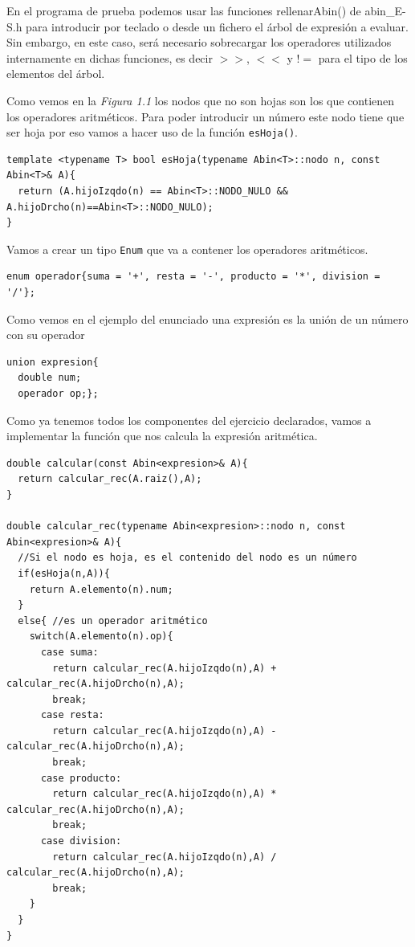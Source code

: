  En el programa de prueba podemos usar las funciones rellenarAbin() de abin\_E-S.h para introducir por teclado o desde un fichero el árbol de expresión a evaluar. Sin
embargo, en este caso, será necesario sobrecargar los operadores utilizados internamente
en dichas funciones, es decir \(>>\), \(<<\) y \(!=\) para el tipo de los elementos del árbol.

Como vemos en la \textit{Figura 1.1} los nodos que no son hojas son los que contienen los operadores aritméticos. Para poder introducir un número este nodo tiene que ser hoja por eso vamos a hacer uso de la función \texttt{esHoja()}.
\begin{verbatim}
template <typename T> bool esHoja(typename Abin<T>::nodo n, const Abin<T>& A){
  return (A.hijoIzqdo(n) == Abin<T>::NODO_NULO && A.hijoDrcho(n)==Abin<T>::NODO_NULO);
} 
\end{verbatim}

Vamos a crear un tipo \texttt{Enum} que va a contener los operadores aritméticos.
\begin{verbatim}
enum operador{suma = '+', resta = '-', producto = '*', division = '/'};
\end{verbatim}

Como vemos en el ejemplo del enunciado una expresión es la unión de un número con su operador
\begin{verbatim}
union expresion{
  double num;
  operador op;};
\end{verbatim}

Como ya tenemos todos los componentes del ejercicio declarados, vamos a implementar la función que nos calcula la expresión aritmética.
\begin{verbatim}
double calcular(const Abin<expresion>& A){
  return calcular_rec(A.raiz(),A);
}

double calcular_rec(typename Abin<expresion>::nodo n, const Abin<expresion>& A){
  //Si el nodo es hoja, es el contenido del nodo es un número
  if(esHoja(n,A)){
    return A.elemento(n).num;
  }
  else{ //es un operador aritmético
    switch(A.elemento(n).op){
      case suma:
        return calcular_rec(A.hijoIzqdo(n),A) + calcular_rec(A.hijoDrcho(n),A);
        break;
      case resta:
        return calcular_rec(A.hijoIzqdo(n),A) - calcular_rec(A.hijoDrcho(n),A);
        break;
      case producto:
        return calcular_rec(A.hijoIzqdo(n),A) * calcular_rec(A.hijoDrcho(n),A);
        break;
      case division:
        return calcular_rec(A.hijoIzqdo(n),A) / calcular_rec(A.hijoDrcho(n),A);
        break;
    }
  }
}
\end{verbatim}
